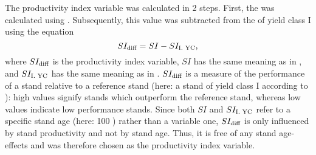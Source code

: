 The productivity index variable was calculated in 2 steps.  First, the \ProductivityIndexText{} was calculated using .  Subsequently, this value was subtracted from the \ProductivityIndexText{} of yield class I using the equation
\begin{equation}
  \label{eq:SiteClassVariable}
  SI_{\text{diff}}{} = SI - SI_{\text{I. YC}}{},
\end{equation}
where \(SI_{\text{diff}}{}\) is the productivity index variable, \(SI\) has the same meaning as in , and \(SI_{\text{I. YC}}{}\) has the same meaning as in .  \(SI_{\text{diff}}{}\) is a measure of the performance of a stand relative to a reference stand (here: a stand of yield class I according to \textcite{Schober1995}): high values signify stands which outperform the reference stand, whereas low values indicate low performance stands.  Since both \(SI\) and \(SI_{\text{I. YC}}{}\) refer to a specific stand age (here: 100 \si{\year}) rather than a variable one, \(SI_{\text{diff}}{}\) is only influenced by stand productivity and not by stand age.  Thus, it is free of any stand age-effects and was therefore chosen as the productivity index variable.


